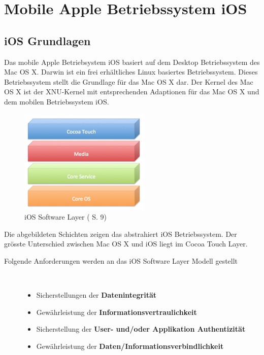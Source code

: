 %
%
% 
% 
% 
\chapter{Mobile Apple Betriebssystem iOS}
\label{ch:iOS}
\section{iOS Grundlagen}
\label{sec:iOSGrundlage}

Das mobile Apple Betriebsystem iOS basiert auf dem Desktop Betriebssystem des Mac OS X. Darwin ist ein frei erhältliches Linux basiertes Betriebssystem. Dieses Betriebssystem stellt die Grundlage für das Mac OS X dar. Der Kernel des Mac OS X ist der XNU-Kernel mit entsprechenden Adaptionen für das Mac OS X und dem mobilen Betriebssystem iOS.
\begin{figure}[htbp]
        \centering
                \includegraphics[height=5cm]{Bilder/Chapter3_SystemArchitektur}
        \caption{iOS Software Layer (\cite{Apple[5]} S. 9)}
        	\label{fig:iOS Software Layer}
\end{figure}
Die abgebildeten Schichten zeigen das abstrahiert iOS Betriebssystem. Der grösste Unterschied zwischen Mac OS X und iOS liegt im Cocoa Touch Layer.
  
\begin{description}
\item[Folgende Anforderungen werden an das iOS Software Layer Modell gestellt]~\par
	\begin{itemize}
		\item Sicherstellungen der \textbf{Datenintegrität}
		\item Gewährleistung der \textbf{Informationsvertraulichkeit}
		\item Sicherstellung der \textbf{User- und/oder Applikation Authentizität}
		\item Gewährleistung der \textbf{Daten/Informationsverbindlichkeit}
	\end{itemize}
\end{description}

